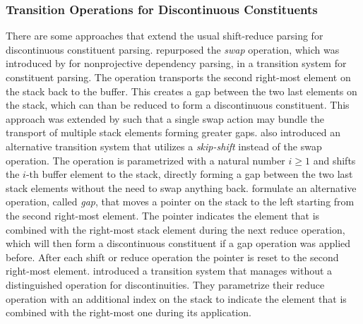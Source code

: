 \documentclass[../document.tex]{subfiles}
\begin{document}
    \subsubsection*{Transition Operations for Discontinuous Constituents}
    There are some approaches that extend the usual shift-reduce parsing for discontinuous constituent parsing.
    \citet{Verseley14b} repurposed the \emph{swap} operation, which was introduced by \citet{Nivre09} for nonprojective dependency parsing, in a transition system for constituent parsing.
    The operation transports the second right-most element on the stack back to the buffer.
    This creates a gap between the two last elements on the stack, which can than be reduced to form a discontinuous constituent.
    This approach was extended by \citet{Maier15} such that a single swap action may bundle the transport of multiple stack elements forming greater gaps.
    \citet{Maier16} also introduced an alternative transition system that utilizes a \emph{skip-shift} instead of the swap operation.
    The operation is parametrized with a natural number \(i \ge 1\) and shifts the \(i\)-th buffer element to the stack, directly forming a gap between the two last stack elements without the need to swap anything back.
    \citet{Coavoux17} formulate an alternative operation, called \emph{gap}, that moves a pointer on the stack to the left starting from the second right-most element.
    The pointer indicates the element that is combined with the right-most stack element during the next reduce operation, which will then form a discontinuous constituent if a gap operation was applied before. 
    After each shift or reduce operation the pointer is reset to the second right-most element.
    \citet{CoaCoh19} introduced a transition system that manages without a distinguished operation for discontinuities.
    They parametrize their reduce operation with an additional index on the stack to indicate the element that is combined with the right-most one during its application.
\end{document}
